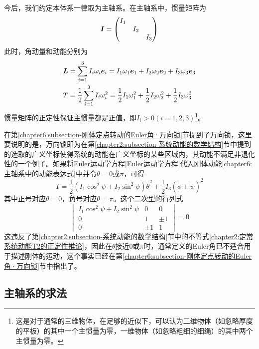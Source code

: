 今后，我们约定本体系一律取为主轴系。在主轴系中，惯量矩阵为
\begin{equation*}
	\boldsymbol{I} = \begin{pmatrix} I_1 & & \\ & I_2 & \\ & & I_3 \end{pmatrix}
\end{equation*}
此时，角动量和动能分别为
\begin{align}
	& \boldsymbol{L} = \sum_{i=1}^3 I_i \omega_i \boldsymbol{e}_i = I_1\omega_1\boldsymbol{e}_1+I_2\omega_2\boldsymbol{e}_2+I_3\omega_3\boldsymbol{e}_3 \label{chapter6:主轴系中的角动量表达式} \\
	& T = \frac12 \sum_{i=1}^3 I_i \omega_i^2 = \frac12 I_1\omega_1^2+\frac12 I_2\omega_2^2+\frac12 I_3\omega_3^2 \label{chapter6:主轴系中的动能表达式}
\end{align}
惯量矩阵的正定性保证主惯量都是正值，即$I_i>0(i=1,2,3)$\footnote{这是对于通常的三维物体，在足够的近似下，可以认为二维物体（如忽略厚度的平板）的其中一个主惯量为零，一维物体（如忽略粗细的细绳）的其中两个主惯量为零。}。

在第\ref{chapter6:subsection-刚体定点转动的Euler角·万向锁}节提到了万向锁，这里要说明的是，万向锁即为在第\ref{chapter2:subsection-系统动能的数学结构}节中提到的选取的广义坐标使得系统的动能在广义坐标的某些区域内，其动能不满足非退化性的一个例子。如果将Euler运动学方程\eqref{Euler运动学方程}代入刚体动能\eqref{chapter6:主轴系中的动能表达式}中并令$\theta=0\text{或}\pi$，可得
\begin{equation}
	T = \frac12 (I_1\cos^2\psi+I_2\sin^2\psi)\dot{\theta}^2 + \frac12 I_3(\dot{\phi}\pm \dot{\psi})^2
\end{equation}
其中正号对应$\theta=0$，负号对应$\theta=\pi$。这个二次型的行列式
\begin{equation*}
	\begin{vmatrix}
		I_1\cos^2\psi+I_2\sin^2\psi & 0 & 0 \\
		0 & 1 & \pm 1 \\
		0 & \pm 1 & 1 
	\end{vmatrix} = 0
\end{equation*}
这违反了第\ref{chapter2:subsection-系统动能的数学结构}节中的不等式\eqref{chapter2:定常系统动能T2的正定性推论}，因此在$\theta$接近$0$或$\pi$时，通常定义的Euler角已不适合用于描述刚体的运动，这个事实已经在第\ref{chapter6:subsection-刚体定点转动的Euler角·万向锁}节中指出了。

\subsection{主轴系的求法}

